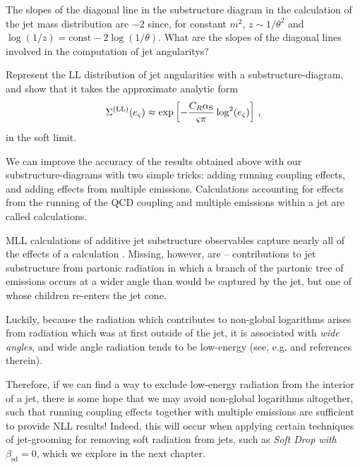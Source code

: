 \begin{exercise}
    The slopes of the diagonal line in the substructure diagram in the calculation of the jet mass distribution are \(-2\) since, for constant \(m^2\), \(z \sim 1/\theta^2\) and \(\log(1/z) = \text{const} - 2 \log(1/\theta)\).
    What are the slopes of the diagonal lines involved in the computation of jet \glspl{angularity}?

    Represent the LL distribution of jet angularities with a \gls{substructure-diagram}, and show that it takes the approximate analytic form
    \begin{align}
        \Sigma^{(\text{LL})}(e_\varsigma)
        \approx
        \exp\left[
            -\frac{C_R\alpha_{\rm S}}{\varsigma \pi}\log^2(e_\varsigma)
        \right]
        \,,
    \end{align}
    in the soft limit.
\end{exercise}

We can improve the accuracy of the results obtained above with our \glspl{substructure-diagram} with two simple tricks:
%
adding running coupling effects, and adding effects from multiple emissions.
%
Calculations accounting for effects from the running of the QCD coupling and multiple emissions within a jet are called  calculations.

MLL calculations of additive jet substructure observables capture nearly all of the effects of a  calculation \cite{Marzani:2019hun}.
%
Missing, however, are  -- contributions to jet substructure from partonic radiation in which a branch of the partonic tree of emissions occurs at a wider angle than would be captured by the jet, but one of whose children re-enters the jet cone.\cite{Dasgupta:2001sh,Appleby:2002ke,Weigert:2003mm,Rubin:2010fc,Banfi:2010pa,Hornig:2011iu,Kelley:2011aa,Hatta:2013iba,Schwartz:2014wha,Khelifa-Kerfa:2015mma,Larkoski:2016zzc,Marzani:2019hun,Banfi:2021owj,Banfi:2021xzn}

Luckily, because the radiation which contributes to non-global logarithms arises from radiation which was at first outside of the jet, it is associated with \textit{wide angles}, and wide angle radiation tends to be low-energy (see, e.g.  and references therein).

Therefore, if we can find a way to exclude low-energy radiation from the interior of a jet, there is some hope that we may avoid non-global logarithms altogether, such that running coupling effects together with multiple emissions are sufficient to provide NLL results!
%
Indeed, this will occur when applying certain techniques of \gls{jet-grooming} for removing soft radiation from jets, such as \textit{Soft Drop with \(\beta_\text{sd}= 0\)}, which we explore in the next chapter.


